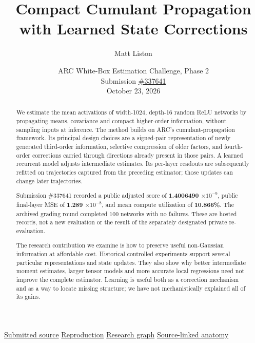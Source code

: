 \documentclass[11pt,letterpaper]{article}
\title{\LARGE\bfseries Compact Cumulant Propagation\\
with Learned State Corrections}
\author{Matt Liston}
\date{\normalsize ARC White-Box Estimation Challenge, Phase 2\\
Submission \href{https://github.com/mattliston/arc-whitebox-estimation-challenge/tree/main/submissions/337641}{\#337641}\\
October 23, 2026}
\begin{document}
\maketitle
{}
\begin{abstract}
We estimate the mean activations of width-1024, depth-16 random ReLU networks by propagating means, covariance and compact higher-order information, without sampling inputs at inference. The method builds on ARC's cumulant-propagation framework. Its principal design choices are a signed-pair representation of newly generated third-order information, selective compression of older factors, and fourth-order corrections carried through directions already present in those pairs. A learned recurrent model adjusts intermediate estimates. Its per-layer readouts are subsequently refitted on trajectories captured from the preceding estimator; those updates can change later trajectories.

Submission \#337641 recorded a public adjusted score of \textbf{1.4006490 \(\times 10^{-9}\)}, public final-layer MSE of \textbf{1.289 \(\times 10^{-8}\)}, and mean compute utilization of \textbf{10.866\%}. The archived grading round completed 100 networks with no failures. These are hosted records, not a new evaluation or the result of the separately designated private re-evaluation.

The research contribution we examine is how to preserve useful non-Gaussian information at affordable cost. Historical controlled experiments support several particular representations and state updates. They also show why better intermediate moment estimates, larger tensor models and more accurate local regressions need not improve the complete estimator. Learning is useful both as a correction mechanism and as a way to locate missing structure; we have not mechanistically explained all of its gains.
\end{abstract}
\vspace{14pt}
\begin{center}
\small
\href{https://github.com/mattliston/arc-whitebox-estimation-challenge/blob/main/submissions/337641/estimator.py}{Submitted source}
\enspace\textperiodcentered\enspace
\href{https://github.com/mattliston/arc-whitebox-estimation-challenge/blob/main/estimator/REPRODUCE.md}{Reproduction}
\enspace\textperiodcentered\enspace
\href{https://mattliston.github.io/arc-whitebox-estimation-challenge/}{Research graph}
\enspace\textperiodcentered\enspace
\href{https://github.com/mattliston/arc-whitebox-estimation-challenge/blob/main/estimator/ANATOMY.md}{Source-linked anatomy}
\end{center}
\clearpage
\end{document}
